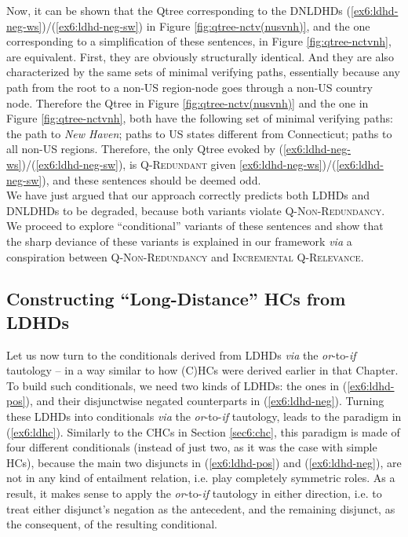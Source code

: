 Now, it can be shown that the Qtree corresponding to the DNLDHDs (\ref{ex6:ldhd-neg-ws})/(\ref{ex6:ldhd-neg-sw}) in Figure \ref{fig:qtree-nctv(nusvnh)}, and the one corresponding to a simplification of these sentences, in Figure \ref{fig:qtree-nctvnh}, are equivalent. First, they are obviously structurally identical. And they are also characterized by the same sets of minimal verifying paths, essentially because any path from the root to a non-US region-node goes through a non-US country node. Therefore the Qtree in Figure \ref{fig:qtree-nctv(nusvnh)} and the one in Figure \ref{fig:qtree-nctvnh}, both have the following set of minimal verifying paths: the path to \textit{New Haven}; paths to US states different from Connecticut; paths to all non-US regions. Therefore, the only Qtree evoked by (\ref{ex6:ldhd-neg-ws})/(\ref{ex6:ldhd-neg-sw}), is \textsc{Q-Redundant} given \ref{ex6:ldhd-neg-ws})/(\ref{ex6:ldhd-neg-sw}), and these sentences should be deemed odd.\\

We have just argued that our approach correctly predicts both LDHDs and DNLDHDs to be degraded, because both variants violate \textsc{Q-Non-Redundancy}. We proceed to explore ``conditional'' variants of these sentences and show that the sharp deviance of these variants is explained in our framework \textit{via} a conspiration between \textsc{Q-Non-Redundancy} and \textsc{Incremental Q-Relevance}.



\subsection{Constructing ``Long-Distance'' HCs from LDHDs}

Let us now turn to the conditionals derived from LDHDs \textit{via} the \textit{or}-to-\textit{if} tautology -- in a way similar to how (C)HCs were derived earlier in that Chapter. To build such conditionals, we need two kinds of LDHDs: the ones in (\ref{ex6:ldhd-pos}), and their disjunctwise negated counterparts in (\ref{ex6:ldhd-neg}).
Turning these LDHDs into conditionals \textit{via} the \textit{or}-to-\textit{if} tautology, leads to the paradigm in (\ref{ex6:ldhc}). Similarly to the CHCs in Section \ref{sec6:chc}, this paradigm is made of four different conditionals (instead of just two, as it was the case with simple HCs), because the main two disjuncts in (\ref{ex6:ldhd-pos}) and (\ref{ex6:ldhd-neg}), are not in any kind of entailment relation, i.e. play completely symmetric roles. As a result, it makes sense to apply the \textit{or}-to-\textit{if} tautology in either direction, i.e. to treat either disjunct's negation as the antecedent, and the remaining disjunct, as the consequent, of the resulting conditional.

